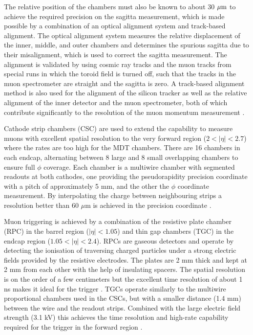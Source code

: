 The relative position of the chambers must also be
known to about 30 $\mu\text{m}$ to achieve the required precision on the sagitta
measurement, which is made possible by a combination of an optical alignment
system and track-based alignment. The optical alignment system measures
the relative displacement of the inner, middle, and outer chambers
and determines the spurious sagitta due to their misalignment, which
is used to correct the sagitta measurement. The alignment is validated
by using cosmic ray tracks and the muon tracks from special runs in
which the toroid field is turned off, such that the tracks in the muon
spectrometer are straight and the sagitta is zero.
A track-based alignment method is also used for the alignment of
the silicon tracker as well as the relative alignment of the inner detector
and the muon spectrometer, both of which contribute significantly to
the resolution of the muon momentum measurement \cite{Aad:2010ag,
Aefsky:1380912, Aad:2008zzm}.


Cathode strip chambers (CSC) are used to extend the capability to measure
muons with excellent spatial resolution to the very forward region
($2 < |\eta| < 2.7$) where the rates are too high for the MDT chambers.
There are 16 chambers in each endcap, alternating between 8 large and 8 small
overlapping chambers to ensure full $\phi$ coverage.
Each chamber is a multiwire chamber with segmented readouts at both cathodes,
one providing the pseudorapidity precision coordinate with a pitch of
approximately 5 mm, and the other the $\phi$ coordinate measurement. 
By interpolating the charge between neighbouring strips a resolution
better than 60 $\mu$m is achieved in the precision coordinate
\cite{CERN-LHCC-97-022, Argyropoulos:2009zz, Aad:2010ag}.

Muon triggering is achieved by a combination of the resistive plate
chamber (RPC) in the barrel region ($|\eta| < 1.05$) and thin gap
chambers (TGC) in the endcap region ($1.05 < |\eta| < 2.4$).
RPCs are gaseous detectors and operate by detecting the ionisation
of traversing charged particles under a strong electric fields
provided by the resistive electrodes. The plates are 2 mm thick
and kept at 2 mm from each other with the help of insulating spacers.
The spatial resolution is on the order of a few centimeters but
the excellent time resolution of about 1 ns makes it ideal for
the trigger \cite{CERN-LHCC-97-022, Cattani_2011}. TGCs operate
similarly to the multiwire proportional chambers used in the CSCs,
but with a smaller distance (1.4 mm) between the wire and the readout strips.
Combined with the large electric field strength (3.1 kV) this achieves
the time resolution and high-rate capability required for
the trigger in the forward region \cite{Nagai:1996mf}.

